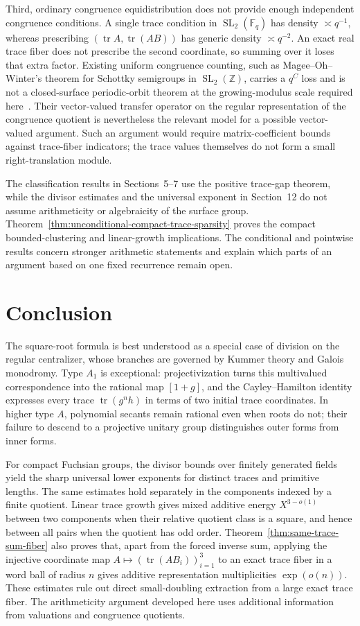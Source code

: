\documentclass[11pt,reqno]{amsart}
\theoremstyle{definition}
\theoremstyle{remark}
\newcommand{\Z}{\mathbb Z}
\newcommand{\Tr}{\operatorname{tr}}
\newcommand{\SL}{\operatorname{SL}}
\begin{document}
Third, ordinary congruence equidistribution does not provide enough
independent congruence conditions.
A single trace condition in \(\SL_2(\mathbb F_q)\) has density
\(\asymp q^{-1}\), whereas prescribing
\((\operatorname{tr}A,\operatorname{tr}(AB))\) has generic density
\(\asymp q^{-2}\).  An exact real trace fiber does not prescribe the second
coordinate, so summing over it loses that extra factor.  Existing uniform
congruence counting, such as Magee--Oh--Winter's theorem for Schottky
semigroups in \(\SL_2(\Z)\), carries a \(q^C\) loss and is not a
closed-surface periodic-orbit theorem at the growing-modulus scale required
here~\cite{MageeOhWinter}.  Their vector-valued transfer operator on the
regular representation of the congruence quotient is nevertheless the
relevant model for a possible vector-valued argument.  Such an argument
would require matrix-coefficient bounds against trace-fiber indicators;
the trace values themselves do not form a small right-translation module.

The classification results in Sections~5--7 use the positive trace-gap
theorem, while the divisor estimates and the universal exponent
in Section~12 do not assume arithmeticity or algebraicity of the surface
group.  Theorem~\ref{thm:unconditional-compact-trace-sparsity} proves the
compact bounded-clustering and linear-growth implications.  The conditional
and pointwise results concern stronger arithmetic statements and explain
which parts of an argument based on one fixed recurrence remain open.

\section{Conclusion}

The square-root formula is best understood as a special case of division on
the regular centralizer, whose branches are governed by Kummer theory and
Galois monodromy.  Type \(A_1\) is exceptional: projectivization turns this
multivalued correspondence into the rational map \([1+g]\), and the
Cayley--Hamilton identity expresses every trace \(\Tr(g^nh)\) in terms of two
initial trace coordinates.  In higher type \(A\), polynomial secants remain
rational even when roots do not; their failure to descend to a projective
unitary group distinguishes outer forms from inner forms.

For compact Fuchsian groups, the divisor bounds over finitely generated
fields yield the sharp universal lower exponents for distinct traces and
primitive lengths.  The same estimates hold separately in the components
indexed by a finite quotient.  Linear trace growth gives mixed additive
energy \(X^{3-o(1)}\) between two components when their relative quotient
class is a square, and hence between all pairs when the quotient has odd
order.  Theorem~\ref{thm:same-trace-sum-fiber} also proves that,
apart from the forced inverse sum, applying the injective coordinate map
\(A\mapsto(\Tr(AB_i))_{i=1}^3\) to an exact trace fiber in a word ball of
radius \(n\) gives additive representation multiplicities \(\exp(o(n))\).
These estimates rule out direct small-doubling extraction from a large
exact trace fiber. The arithmeticity argument developed here uses additional
information from valuations and congruence quotients.
\end{document}
